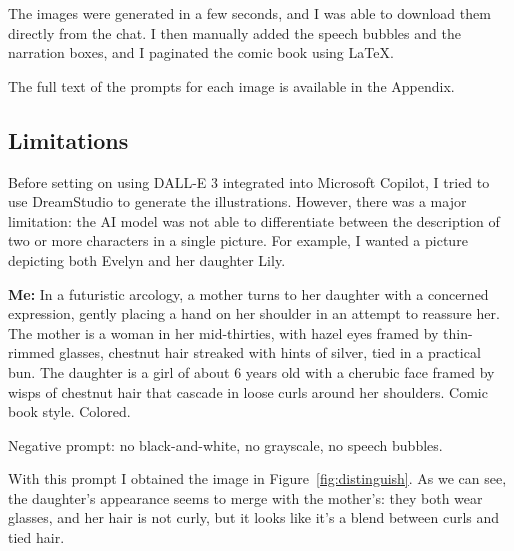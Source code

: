 \documentclass[a4paper,11pt]{article}
\newenvironment{shadedquotation3}
    {\colorlet{shadecolor}{Purple!15}\begin{shaded*}
    \quoting[leftmargin=1cm, rightmargin=1cm, vskip=0pt]
    }
    {\endquoting
    \end{shaded*}
}
\begin{document}
The images were generated in a few seconds, and I was able to download them directly from the chat. I then manually added the speech bubbles and the narration boxes, and I paginated the comic book using \LaTeX.\medskip

The full text of the prompts for each image is available in the Appendix.

\subsection*{Limitations}
Before setting on using DALL-E 3 integrated into Microsoft Copilot, I tried to use DreamStudio to generate the illustrations. However, there was a major limitation: the AI model was not able to differentiate between the description of two or more characters in a single picture. For example, I wanted a picture depicting both Evelyn and her daughter Lily.

\begin{shadedquotation3}
    \textbf{Me:} In a futuristic arcology, a mother turns to her daughter with a concerned expression, gently placing a hand on her shoulder in an attempt to reassure her. The mother is a woman in her mid-thirties, with hazel eyes framed by thin-rimmed glasses, chestnut hair streaked with hints of silver, tied in a practical bun. The daughter is a girl of about 6 years old with a cherubic face framed by wisps of chestnut hair that cascade in loose curls around her shoulders. Comic book style. Colored.\smallskip 

    \noindent Negative prompt: no black-and-white, no grayscale,  no speech bubbles.
\end{shadedquotation3}

With this prompt I obtained the image in Figure~\vref{fig:distinguish}. As we can see, the daughter's appearance seems to merge with the mother's:  they both wear glasses, and her hair is not curly, but it looks like it's a blend between curls and tied hair. 
\end{document}
